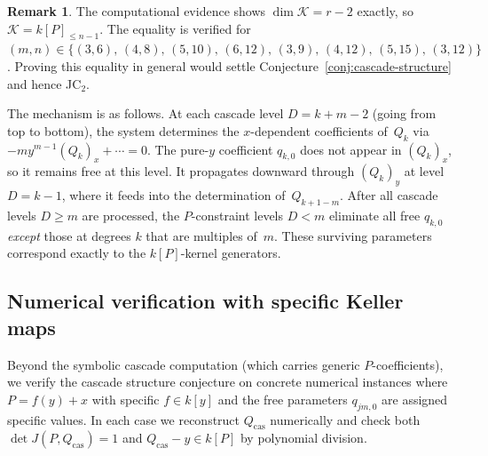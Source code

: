 \documentclass[12pt,a4paper]{article}
\theoremstyle{definition}
\newtheorem{remark}[theorem]{Remark}
\newcommand{\kk}{k}
\begin{document}
\begin{remark}
The computational evidence shows $\dim \mathcal{K} = r-2$ exactly,
so $\mathcal{K} = \kk[P]_{\leq n-1}$. The equality is verified for
$(m,n) \in \{(3,6),\, (4,8),\, (5,10),\, (6,12),\, (3,9),\, (4,12),\,
(5,15),\, (3,12)\}$.
Proving this equality in general would settle
Conjecture~\ref{conj:cascade-structure} and hence JC$_2$.

The mechanism is as follows. At each cascade level $D = k + m - 2$
(going from top to bottom), the system determines the $x$-dependent
coefficients of~$Q_k$ via $-m y^{m-1} (Q_k)_x + \cdots = 0$.
The pure-$y$ coefficient $q_{k,0}$ does not appear in $(Q_k)_x$,
so it remains free at this level. It propagates downward through
$(Q_k)_y$ at level $D = k-1$, where it feeds into the determination
of~$Q_{k+1-m}$. After all cascade levels $D \geq m$ are processed,
the $P$-constraint levels $D < m$ eliminate all free $q_{k,0}$
\emph{except} those at degrees $k$ that are multiples of~$m$.
These surviving parameters correspond exactly to the $\kk[P]$-kernel
generators.
\end{remark}

\subsection{Numerical verification with specific Keller maps}\label{sec:numerical}

Beyond the symbolic cascade computation (which carries generic
$P$\nobreakdash-coefficients), we verify the cascade structure conjecture
on concrete numerical instances where $P = f(y) + x$ with specific
$f \in \kk[y]$ and the free parameters $q_{jm,0}$ are assigned specific
values. In each case we reconstruct $Q_{\mathrm{cas}}$ numerically and
check both $\det J(P, Q_{\mathrm{cas}}) = 1$ and
$Q_{\mathrm{cas}} - y \in \kk[P]$ by polynomial division.
\end{document}

